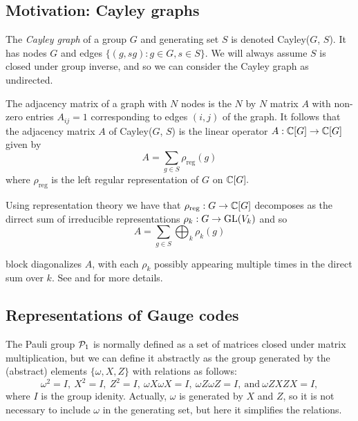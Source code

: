 \documentclass[12pt,notitlepage,longbibliography,nofootinbib,tightenlines]{revtex4}
\begin{document}
%
%

\subsection{Motivation: Cayley graphs}

\def\rhoreg{\rho_\mathrm{reg}}

The {\it Cayley graph} of a group $G$ and
generating set $S$ is denoted Cayley($G$, $S$).
It has nodes $G$ and edges $\{(g, sg) : g \in G, s \in S\}$.
We will always assume $S$ is closed under group inverse,
and so we can consider the Cayley graph as undirected.

The adjacency matrix of a graph with $N$ nodes is the 
$N$ by $N$ matrix $A$ with non-zero entries $A_{ij}=1$ corresponding
to edges $(i, j)$ of the graph.
It follows that the adjacency matrix $A$ of Cayley($G$, $S$)
is the linear operator $A:\mathbb{C}[G]\to\mathbb{C}[G]$
given by
$$
    A = \sum_{g\in S}\rho_{\mathrm{reg}}(g)
$$
where $\rho_{\mathrm{reg}}$ is the left regular representation of
$G$ on $\mathbb{C}[G].$

Using representation theory we have that 
$\rhoreg:G\to \Complex[G]$
decomposes as the dirrect sum of irreducible
representations $\rho_k:G\to \mathrm{GL}(V_k)$
and so
$$
    A = \sum_{g\in S}\bigoplus_k \rho_k(g)
$$

block diagonalizes $A$,
with each $\rho_k$ possibly appearing multiple
times in the direct sum over $k$.
See \cite{Diaconis1981} and \cite{Kaski2002} for more details.

%
%

\subsection{Representations of Gauge codes}

The Pauli group $\mathcal{P}_1$ is normally 
defined as a set of matrices closed under
matrix multiplication, but we can define
it abstractly
as the group generated
by the (abstract) elements $\{\omega, X, Z\}$ with
relations as follows:
$$
\omega^2=I,\ X^2=I,\ Z^2=I,\ \omega X\omega X=I,\ \omega Z\omega Z=I,\ \mbox{and}\  \omega ZXZX=I,
$$
where $I$ is the group idenity.
Actually, $\omega $ is generated by $X$ and $Z$, so
it is not necessary to include $\omega $ in the generating set,
but here it simplifies the relations.
\end{document}
